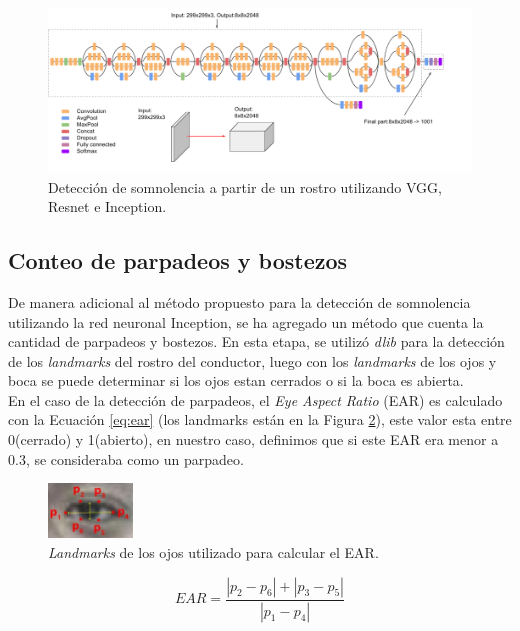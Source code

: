 \documentclass{article}
\begin{document}
	
	
	\begin{figure}[H]
		\centering
		\includegraphics[width=\textwidth]{img/inception}		
		\caption{Detección de somnolencia a partir de un rostro utilizando VGG, Resnet e Inception.}
		\label{fig:inception}
	\end{figure}

	\subsection{Conteo de parpadeos y bostezos}
	De manera adicional al método propuesto para la detección de somnolencia utilizando la red neuronal Inception, se ha agregado un método que cuenta la cantidad de parpadeos y bostezos. En esta etapa, se utilizó \textit{dlib} para la detección de los \textit{landmarks} del rostro del conductor, luego con los \textit{landmarks} de los ojos y boca se puede determinar si los ojos estan cerrados o si la boca es abierta. \\
	
	En el caso de la detección de parpadeos, el \textit{Eye Aspect Ratio} (EAR) es calculado con la Ecuación \ref{eq:ear} (los landmarks están en la Figura \ref{fig:ear}), este valor esta entre 0(cerrado) y 1(abierto), en nuestro caso, definimos que si este EAR era menor a 0.3, se consideraba como un parpadeo.
	
	\begin{figure}[H]
		\centering
		\includegraphics[width=0.2\textwidth]{img/perclos_eye}		
		\caption{\textit{Landmarks} de los ojos utilizado para calcular el EAR.}
		\label{fig:ear}
	\end{figure}

	\begin{equation}\label{eq:ear}
		EAR = \frac{| p_2  - p_6| + | p_3 - p_5 |}{ | p_1 - p_4 | } 
	\end{equation}
\end{document}
